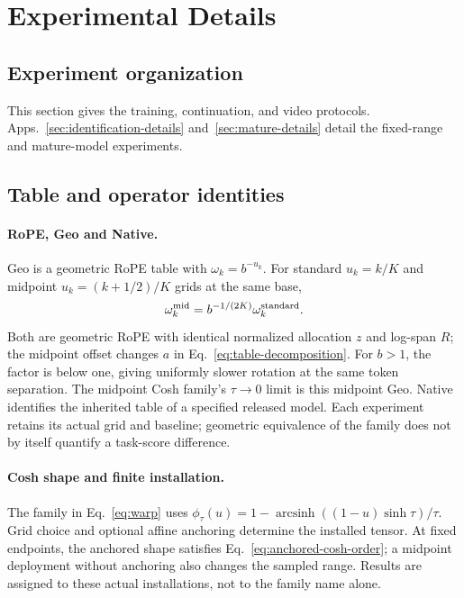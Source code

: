 \section{Experimental Details}
\label{sec:experiment-details}

\FloatBarrier
\subsection{Experiment organization}

This section gives the training, continuation, and video protocols.
Apps.~\ref{sec:identification-details} and~\ref{sec:mature-details} detail
the fixed-range and mature-model experiments.

\subsection{Table and operator identities}
\label{sec:table-identities}

\paragraph{RoPE, Geo and Native.}
Geo is a geometric RoPE table with $\omega_k=b^{-u_k}$. For standard $u_k=k/K$ and midpoint $u_k=(k+1/2)/K$ grids at the same base,
\[
\omega_k^{\rm mid}=b^{-1/(2K)}\omega_k^{\rm standard}.
\]
Both are geometric RoPE with identical normalized allocation $z$ and log-span $R$; the midpoint offset changes $a$ in Eq.~\eqref{eq:table-decomposition}. For $b>1$, the factor is below one, giving uniformly slower rotation at the same token separation. The midpoint Cosh family's $\tau\to0$ limit is this midpoint Geo. Native identifies the inherited table of a specified released model. Each experiment retains its actual grid and baseline; geometric equivalence of the family does not by itself quantify a task-score difference.

\paragraph{Cosh shape and finite installation.}
The family in Eq.~\eqref{eq:warp} uses $\phi_\tau(u)=1-\operatorname{arcsinh}((1-u)\sinh\tau)/\tau$. Grid choice and optional affine anchoring determine the installed tensor. At fixed endpoints, the anchored shape satisfies Eq.~\eqref{eq:anchored-cosh-order}; a midpoint deployment without anchoring also changes the sampled range. Results are assigned to these actual installations, not to the family name alone.

